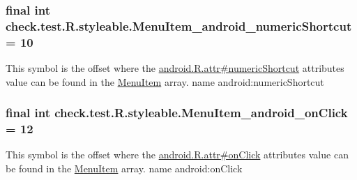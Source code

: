 \subsubsection[{Menu\+Item\+\_\+android\+\_\+numeric\+Shortcut}]{\setlength{\rightskip}{0pt plus 5cm}final int check.\+test.\+R.\+styleable.\+Menu\+Item\+\_\+android\+\_\+numeric\+Shortcut = 10\hspace{0.3cm}{\ttfamily [static]}}\label{classcheck_1_1test_1_1_r_1_1styleable_ab191ae989550111a8c237ae16c0edddb}
This symbol is the offset where the \hyperlink{}{android.\+R.\+attr\#numeric\+Shortcut} attribute\textquotesingle{}s value can be found in the \hyperlink{classcheck_1_1test_1_1_r_1_1styleable_af26376072eab01d1b4197e48992dc936}{Menu\+Item} array.  name android\+:numeric\+Shortcut \hypertarget{classcheck_1_1test_1_1_r_1_1styleable_ab293bb00a7a1be438c2631ec1b79c3cf}{}
\subsubsection[{Menu\+Item\+\_\+android\+\_\+on\+Click}]{\setlength{\rightskip}{0pt plus 5cm}final int check.\+test.\+R.\+styleable.\+Menu\+Item\+\_\+android\+\_\+on\+Click = 12\hspace{0.3cm}{\ttfamily [static]}}\label{classcheck_1_1test_1_1_r_1_1styleable_ab293bb00a7a1be438c2631ec1b79c3cf}
This symbol is the offset where the \hyperlink{}{android.\+R.\+attr\#on\+Click} attribute\textquotesingle{}s value can be found in the \hyperlink{classcheck_1_1test_1_1_r_1_1styleable_af26376072eab01d1b4197e48992dc936}{Menu\+Item} array.  name android\+:on\+Click \hypertarget{classcheck_1_1test_1_1_r_1_1styleable_a65a13cc3cfb4d4146adc454569280de7}{}

